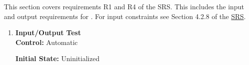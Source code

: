 \documentclass[12pt, titlepage]{article}
\newcommand{\Tthetestnum}{T\thetestnum}
\begin{document}
This section covers requirements R1 and R4 of the SRS. This includes the input and output
requirements for \progname{}. For input constraints see Section 4.2.8 of the
\href{https://github.com/adrian-soch/attitude_check/blob/main/docs/SRS/SRS.pdf}{SRS}.



\begin{enumerate}

\item[\refstepcounter{testnum} \Tthetestnum \label{t:sys_io}:] \textbf{Input/Output Test} \\


    \textbf{Control:} Automatic

    \textbf{Initial State:} Uninitialized


\end{enumerate}
\end{document}
